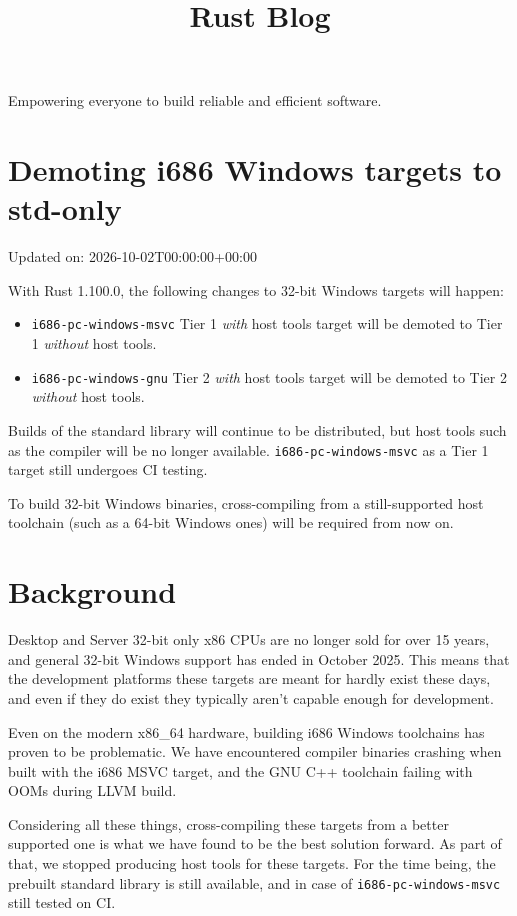 \documentclass[11pt,a4paper]{article}
\title{Rust Blog}
\begin{document}
\maketitle

Empowering everyone to build reliable and efficient software.

\section{Demoting i686 Windows targets to std-only}

Updated on: 2026-10-02T00:00:00+00:00

With Rust 1.100.0, the following changes to 32-bit Windows targets will happen:

\begin{itemize}
\item \texttt{i686-pc-windows-msvc} Tier 1 \textit{with} host tools target will be demoted to Tier 1 \textit{without} host tools.
\item \texttt{i686-pc-windows-gnu} Tier 2 \textit{with} host tools target will be demoted to Tier 2 \textit{without} host tools.
\end{itemize}

Builds of the standard library will continue to be distributed, but host tools such as the compiler will be no longer available. \texttt{i686-pc-windows-msvc} as a Tier 1 target still undergoes CI testing.

To build 32-bit Windows binaries, cross-compiling from a still-supported host toolchain (such as a 64-bit Windows ones) will be required from now on.

\section{Background}

Desktop and Server 32-bit only x86 CPUs are no longer sold for over 15 years, and general 32-bit Windows support has ended in October 2025. This means that the development platforms these targets are meant for hardly exist these days, and even if they do exist they typically aren't capable enough for development.

Even on the modern x86\_64 hardware, building i686 Windows toolchains has proven to be problematic. We have encountered compiler binaries crashing when built with the i686 MSVC target, and the GNU C++ toolchain failing with OOMs during LLVM build.

Considering all these things, cross-compiling these targets from a better supported one is what we have found to be the best solution forward. As part of that, we stopped producing host tools for these targets. For the time being, the prebuilt standard library is still available, and in case of \texttt{i686-pc-windows-msvc} still tested on CI.
\end{document}
